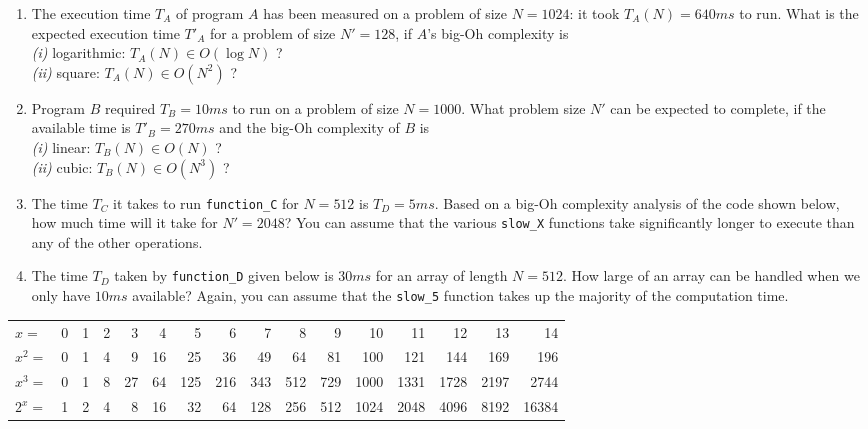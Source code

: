 \documentclass[a4paper]{article}
\begin{document}
\begin{enumerate}

\item
  The execution time $T_A$ of program $A$ has been measured on a problem of size $N=1024$:
  it took $T_A(N) = 640ms$ to run.
  What is the expected execution time $T'_A$ for a problem of size $N'=128$, if $A$'s big-Oh complexity is\\
  \emph{(i)} logarithmic: $T_A(N) \in O(\log N)$ ?\\
  \emph{(ii)} square: $T_A(N) \in O(N^2)$ ?
  
\item
  Program $B$ required $T_B=10ms$ to run on a problem of size $N=1000$.
  What problem size $N'$ can be expected to complete, if the available time is $T'_B=270ms$ and the big-Oh complexity of $B$ is\\
  \emph{(i)} linear: $T_B(N) \in O(N)$ ?\\
  \emph{(ii)} cubic: $T_B(N) \in O(N^3)$ ?
  
\item
  The time $T_C$ it takes to run \texttt{function\_C} for $N=512$ is $T_D=5ms$.
  Based on a big-Oh complexity analysis of the code shown below, how much time will it take for $N'=2048$?
  You can assume that the various \texttt{slow\_X} functions take significantly longer to execute than any of the other operations.
  
\item
  The time $T_D$ taken by \texttt{function\_D} given below is $30ms$ for an array of length $N=512$.
  How large of an array can be handled when we only have $10ms$ available?
  Again, you can assume that the \texttt{slow\_5} function takes up the majority of the computation time.
  
\end{enumerate}
  
\vfill

\noindent
{}\hfill
{}

\vfill

\noindent
\begin{tabular}{|l|r|r|r|r|r|r|r|r|r|r|r|r|r|r|r|}
  \hline
  $x=$   & 0 & 1 & 2 &  3 &  4 &   5 &   6 &   7 &   8 &   9 &   10 &   11 &   12 &   13 &    14 \\
  $x^2=$ & 0 & 1 & 4 &  9 & 16 &  25 &  36 &  49 &  64 &  81 &  100 &  121 &  144 &  169 &   196 \\
  $x^3=$ & 0 & 1 & 8 & 27 & 64 & 125 & 216 & 343 & 512 & 729 & 1000 & 1331 & 1728 & 2197 &  2744 \\
  $2^x=$ & 1 & 2 & 4 &  8 & 16 &  32 &  64 & 128 & 256 & 512 & 1024 & 2048 & 4096 & 8192 & 16384 \\
  \hline
\end{tabular}
\end{document}
